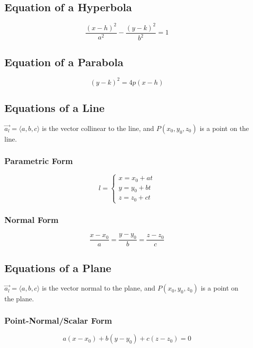 \documentclass[a4paper,12pt,openany]{book}
\begin{document}
\subsection{Equation of a Hyperbola}
\begin{equation}\label{Equation of a Hyperbola}
    \dfrac{(x-h)^2}{a^2} - \dfrac{(y-k)^2}{b^2} = 1
\end{equation}
\subsection{Equation of a Parabola}
\begin{equation}\label{Equation of a Parabola}
    (y-k)^2 = 4p(x-h)
\end{equation}

\subsection{Equations of a Line}
\(\vec{a_l} = \langle a, b, c \rangle\) is the vector collinear to the line, and \(P(x_0, y_0, z_0)\) is a point on the line.
\subsubsection{Parametric Form}
\begin{equation}\label{Parametric Form of a Line}
    l = 
    \begin{cases}
        x = x_0 + at\\
        y = y_0 + bt\\
        z = z_0 + ct
    \end{cases}
\end{equation}

\subsubsection{Normal Form}
\begin{equation}\label{Normal Form of a Line}
    \dfrac{x-x_0}{a} = \dfrac{y-y_0}{b} = \dfrac{z-z_0}{c}
\end{equation}

\subsection{Equations of a Plane}
\(\vec{a_l} = \langle a, b, c \rangle\) is the vector normal to the plane, and \(P(x_0, y_0, z_0)\) is a point on the plane.
\subsubsection{Point-Normal/Scalar Form}
\begin{equation}\label{Point-Normal Form of a Plane}
    a(x-x_0) + b(y-y_0) + c(z-z_0) = 0
\end{equation}
\end{document}
